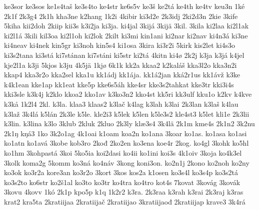 {    ke3sor
    ke3sos
    ke1s4taš
    ke3s4to
    ke4str
    ke6s5v
    ke3š
    ke2tá
    ke4th
    ke4tv
    keu3n
    1ké
    2k1f
    2k3g4
    2k1h
    kha3ne
    k2hang
    1k2i
    4kibir
    ki3d2e
    2k3idj
    2ki2d3n
    2kie
    3kife
    5kiha
    kii2doh
    2kiip
    kii3s
    k3i2ja
    ki3ja.
    ki4jal
    3kijá
    3kijä
    3kil.
    3kila
    ki2laa
    ki2l1ak
    ki2l1á
    3kili
    kil3oa
    ki2l1oh
    ki2lok
    2kilt
    ki3mi
    kin1ani
    ki2nar
    ki2nav
    ki4n3á
    ki3ne
    ki4neav
    ki4nek
    kin5gr
    ki3noh
    kin5s4
    ki1osa
    3kira
    ki3r2i
    5kirk
    kis2let
    ki4s3o
    ki3s2tana
    ki3stá
    ki7stánan
    ki7stáni
    ki5str
    ki2tá
    4kitn
    ki4ø
    2k2j
    k3ja
    k3já
    k4jel
    kje2l1a
    k3ji
    5kjos
    k3ju
    4k5jä
    1kjø
    6k1k
    kk2a
    kkaa2
    k2kaláš
    kka3l2o
    kka3n2i
    kkap4
    kka3r2o
    kka2sel
    kka1u
    kk1ádj
    kk1ája.
    kk1á2jan
    kká2r1us
    kk1ávž
    k3ke
    k4k1ean
    kke1ap
    kk1eat
    kke5p
    kke6s5áh
    kke4sr
    kke3s2tahkat
    kke3tr
    kki3i4s
    kki3sle
    k3k4j
    k2klo
    kkoa2
    kko1av
    k3ko3n2
    kko4st
    kk5ri
    kk3ulf
    kku1o
    k2kv
    k4kve
    k3kå
    1k2l4
    2kl.
    k3la.
    klaa3
    klaas2
    k3lač
    k4lag
    k3lah
    k3lai
    2k3lan
    k3laš
    k4lau
    k3laž
    3k4lá
    k5lán
    2k3le
    k5le.
    kle2i3
    k5lek
    k5len
    k5le3s2
    kle4st3
    k5let
    kli1e
    2k3lii
    k3lin.
    k3lina
    k3lo
    3klub
    2kluk
    2kluo
    2k3ly
    klæ3s4
    3k4lä
    2k1m
    kme4s
    2k1n2
    3k2nu
    2k1ŋ
    kŋá3
    1ko
    3k2o1ag
    4k1oai
    k1oam
    koa2n
    ko1ana
    3koar
    ko1as.
    ko1asa
    ko1asi
    ko1atn
    ko1avá
    3kobe
    kob3ro
    2kođ
    2ko2en
    ko3ena
    koe4r
    2kog.
    ko4gl
    3kohk
    ko5hl
    ko1hm
    3kohpastá
    3koi
    5ko5ia
    koi2dasi
    ko4ii
    ko1ini
    koi3s
    4k1oiv
    3koja
    ko4k3el
    3kolk
    koma2g
    5komm
    ko3ná
    ko4náv
    3kong
    koni3on.
    ko2n1j
    2kono
    ko2noh
    ko2ny
    ko3ok
    ko3r2a
    kore3an
    ko3r2o
    3kort
    3kos
    kos2a
    k1osen
    ko3s4l
    ko3s4p
    ko3s2tá
    ko3s2to
    ko6str
    ko2š1al
    ko3to
    ko3tr
    ko4tra
    ko4tro
    kot4s
    7kovat
    3kovág
    3kovák
    3kovu
    4kovv
    1kó
    2k1p
    kpo5p
    k1q
    1k2r2
    k3ra.
    2k3raa
    k3rah
    k3rai
    2k3raj
    k3ras
    krat2
    kra5ta
    2kratiijaa
    2kratiijač
    2kratiijao
    3kratiijaođ
    2kratiijap
    krave3
    3k4rá
}
